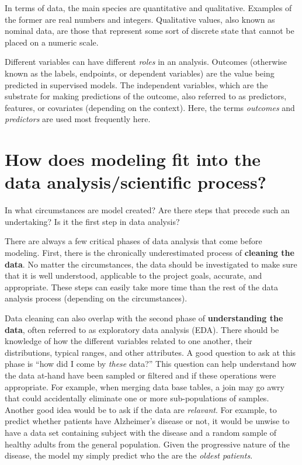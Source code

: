 \documentclass[11pt]{book}
\begin{document}
In terms of data, the main species are quantitative and qualitative. Examples of the former are real numbers and integers. Qualitative values, also known as nominal data, are those that represent some sort of discrete state that cannot be placed on a numeric scale.

Different variables can have different \emph{roles} in an analysis. Outcomes (otherwise known as the labels, endpoints, or dependent variables) are the value being predicted in supervised models. The independent variables, which are the substrate for making predictions of the outcome, also referred to as predictors, features, or covariates (depending on the context). Here, the terms \emph{outcomes} and \emph{predictors} are used most frequently here.

\hypertarget{model-phases}{%
\section{How does modeling fit into the data analysis/scientific process?}\label{model-phases}}

In what circumstances are model created? Are there steps that precede such an undertaking? Is it the first step in data analysis?

There are always a few critical phases of data analysis that come before modeling. First, there is the chronically underestimated process of \textbf{cleaning the data}. No matter the circumstances, the data should be investigated to make sure that it is well understood, applicable to the project goals, accurate, and appropriate. These steps can easily take more time than the rest of the data analysis process (depending on the circumstances).

Data cleaning can also overlap with the second phase of \textbf{understanding the data}, often referred to as exploratory data analysis (EDA). There should be knowledge of how the different variables related to one another, their distributions, typical ranges, and other attributes. A good question to ask at this phase is ``how did I come by \emph{these} data?'' This question can help understand how the data at-hand have been sampled or filtered and if these operations were appropriate. For example, when merging data base tables, a join may go awry that could accidentally eliminate one or more sub-populations of samples. Another good idea would be to ask if the data are \emph{relavant}. For example, to predict whether patients have Alzheimer's disease or not, it would be unwise to have a data set containing subject with the disease and a random sample of healthy adults from the general population. Given the progressive nature of the disease, the model my simply predict who the are the \emph{oldest patients}.
\end{document}

